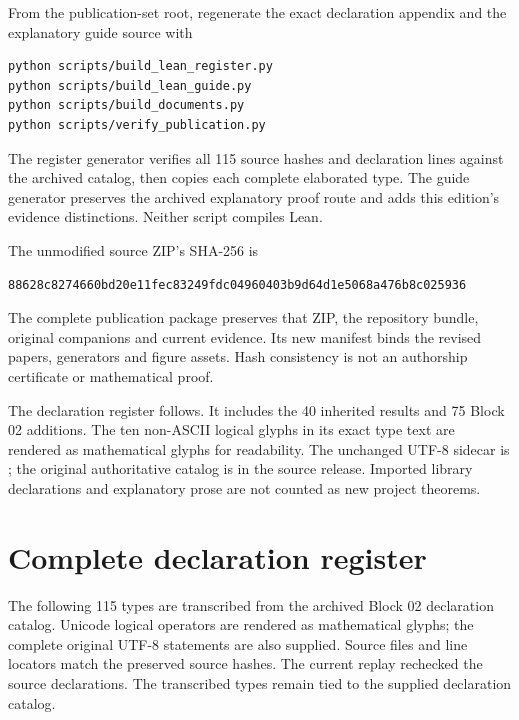 From the publication-set root, regenerate the exact declaration appendix and
the explanatory guide source with
\begin{lstlisting}
python scripts/build_lean_register.py
python scripts/build_lean_guide.py
python scripts/build_documents.py
python scripts/verify_publication.py
\end{lstlisting}
The register generator verifies all 115 source hashes and declaration lines
against the archived catalog, then copies each complete elaborated type.
The guide generator preserves the archived explanatory proof route and adds
this edition's evidence distinctions. Neither script compiles Lean.

The unmodified source ZIP's SHA-256 is
\begin{lstlisting}
88628c8274660bd20e11fec83249fdc04960403b9d64d1e5068a476b8c025936
\end{lstlisting}
The complete publication package preserves that ZIP, the repository bundle,
original companions and current evidence. Its new manifest binds the revised
papers, generators and figure assets. Hash consistency is not an authorship
certificate or mathematical proof.

The declaration register follows. It includes the 40 inherited results and
75 Block 02 additions. The ten non-ASCII logical glyphs in its exact type text
are rendered as mathematical glyphs for readability. The unchanged UTF-8
sidecar is ; the original authoritative
catalog is  in the source
release. Imported library declarations and explanatory prose are not counted
as new project theorems.
\clearpage\section*{Complete declaration register}
The following 115 types are transcribed from the archived Block 02 declaration catalog. Unicode logical operators are rendered as mathematical glyphs; the complete original UTF-8 statements are also supplied. Source files and line locators match the preserved source hashes. The current replay rechecked the source declarations. The transcribed types remain tied to the supplied declaration catalog.
\begingroup
{}

